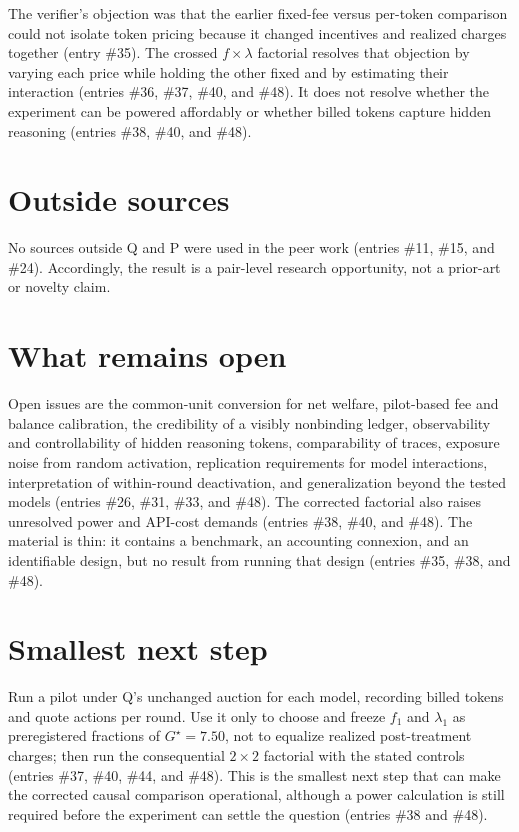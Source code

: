 \documentclass{article}
\begin{document}
The verifier's objection was that the earlier fixed-fee versus per-token comparison could not isolate token pricing because it changed incentives and realized charges together (entry \#35).  The crossed \(f\times\lambda\) factorial resolves that objection by varying each price while holding the other fixed and by estimating their interaction (entries \#36, \#37, \#40, and \#48).  It does not resolve whether the experiment can be powered affordably or whether billed tokens capture hidden reasoning (entries \#38, \#40, and \#48).

\section{Outside sources}
No sources outside Q and P were used in the peer work (entries \#11, \#15, and \#24).  Accordingly, the result is a pair-level research opportunity, not a prior-art or novelty claim.

\section{What remains open}
Open issues are the common-unit conversion for net welfare, pilot-based fee and balance calibration, the credibility of a visibly nonbinding ledger, observability and controllability of hidden reasoning tokens, comparability of traces, exposure noise from random activation, replication requirements for model interactions, interpretation of within-round deactivation, and generalization beyond the tested models (entries \#26, \#31, \#33, and \#48).  The corrected factorial also raises unresolved power and API-cost demands (entries \#38, \#40, and \#48).  The material is thin: it contains a benchmark, an accounting connexion, and an identifiable design, but no result from running that design (entries \#35, \#38, and \#48).

\section{Smallest next step}
Run a pilot under Q's unchanged auction for each model, recording billed tokens and quote actions per round.  Use it only to choose and freeze \(f_1\) and \(\lambda_1\) as preregistered fractions of \(G^{\star}=7.50\), not to equalize realized post-treatment charges; then run the consequential \(2\times2\) factorial with the stated controls (entries \#37, \#40, \#44, and \#48).  This is the smallest next step that can make the corrected causal comparison operational, although a power calculation is still required before the experiment can settle the question (entries \#38 and \#48).
\end{document}
